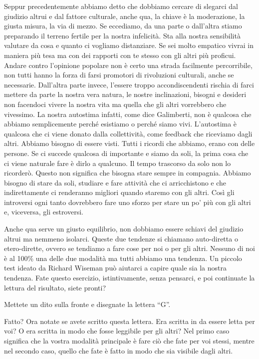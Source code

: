 \documentclass[12pt]{book} %
\begin{document}
Seppur precedentemente abbiamo detto che dobbiamo cercare di slegarci dal giudizio altrui e dal fattore culturale, anche
qua, la chiave è la moderazione, la giusta misura, la via di mezzo. Se eccediamo, da una parte o
dall'altra stiamo preparando il terreno fertile per la nostra infelicità. Sta alla nostra
sensibilità valutare da cosa e quanto ci vogliamo distanziare. Se sei molto empatico vivrai in maniera più tesa ma con
dei rapporti con te stesso con gli altri più proficui. Andare contro l'opinione popolare non è
certo una strada facilmente percorribile, non tutti hanno la forza di farsi promotori di rivoluzioni culturali, anche
se necessarie. Dall'altra parte invece, l'essere troppo accondiscendenti
rischia di farci mettere da parte la nostra vera natura, le nostre inclinazioni, bisogni e desideri non facendoci
vivere la nostra vita ma quella che gli altri vorrebbero che vivessimo. La nostra autostima infatti, come dice
Galimberti, non è qualcosa che abbiamo semplicemente perché esistiamo o perché siamo vivi.
L'autostima è qualcosa che ci viene donato dalla collettività, come feedback che riceviamo dagli
altri. Abbiamo bisogno di essere visti.
Tutti i ricordi che abbiamo, erano con delle persone. Se ci succede qualcosa di importante e siamo da soli, la prima cosa che ci viene naturale fare è dirlo a qualcuno. Il tempo trascorso da solo non lo ricorderò. Questo non significa che bisogna stare sempre in compagnia. Abbiamo bisogno di stare da soli, studiare e fare attività che ci arricchistono e che indirettamente ci renderanno migliori quando staremo con gli altri. Così gli introversi ogni tanto dovrebbero fare uno sforzo per stare  un po' più con gli altri e, viceversa, gli estroversi.

Anche qua serve un giusto equilibrio, non dobbiamo essere schiavi del giudizio altrui ma nemmeno isolarci. Queste due
tendenze si chiamano auto-diretta o etero-dirette, ovvero se tendiamo a fare cose per noi o per gli altri. Nessuno di
noi è al 100\% una delle due modalità ma tutti abbiamo una tendenza. Un piccolo test ideato da Richard Wiseman può
aiutarci a capire quale sia la nostra tendenza. Fate questo esercizio, istintivamente, senza pensarci, e poi continuate
la lettura del risultato, siete pronti?

Mettete un dito sulla fronte e disegnate la lettera “G”.

Fatto? Ora notate se avete scritto questa lettera. Era scritta in da essere letta per voi? O era scritta in modo che
fosse leggibile per gli altri? Nel primo caso significa che la vostra modalità principale è fare ciò che fate per voi
stessi, mentre nel secondo caso, quello che fate è fatto in modo che sia visibile dagli altri.
\end{document}
